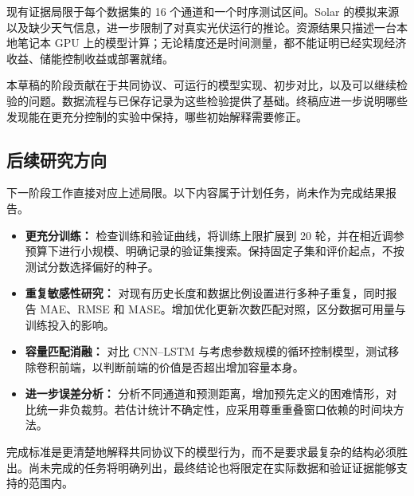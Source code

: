 \documentclass[12pt,a4paper,UTF8]{ctexart}
\begin{document}
现有证据局限于每个数据集的 16 个通道和一个时序测试区间。Solar 的模拟来源以及缺少天气信息，进一步限制了对真实光伏运行的推论。资源结果只描述一台本地笔记本 GPU 上的模型计算；无论精度还是时间测量，都不能证明已经实现经济收益、储能控制收益或部署就绪。

本草稿的阶段贡献在于共同协议、可运行的模型实现、初步对比，以及可以继续检验的问题。数据流程与已保存记录为这些检验提供了基础。终稿应进一步说明哪些发现能在更充分控制的实验中保持，哪些初始解释需要修正。

\subsection{后续研究方向}
下一阶段工作直接对应上述局限。以下内容属于计划任务，尚未作为完成结果报告。
\begin{itemize}
\item \textbf{更充分训练：} 检查训练和验证曲线，将训练上限扩展到 20 轮，并在相近调参预算下进行小规模、明确记录的验证集搜索。保持固定子集和评价起点，不按测试分数选择偏好的种子。
\item \textbf{重复敏感性研究：} 对现有历史长度和数据比例设置进行多种子重复，同时报告 MAE、RMSE 和 MASE。增加优化更新次数匹配对照，区分数据可用量与训练投入的影响。
\item \textbf{容量匹配消融：} 对比 CNN--LSTM 与考虑参数规模的循环控制模型，测试移除卷积前端，以判断前端的价值是否超出增加容量本身。
\item \textbf{进一步误差分析：} 分析不同通道和预测距离，增加预先定义的困难情形，对比统一非负裁剪。若估计统计不确定性，应采用尊重重叠窗口依赖的时间块方法。
\end{itemize}
完成标准是更清楚地解释共同协议下的模型行为，而不是要求最复杂的结构必须胜出。尚未完成的任务将明确列出，最终结论也将限定在实际数据和验证证据能够支持的范围内。

\label{report:body-end}
\clearpage{}

\end{document}
